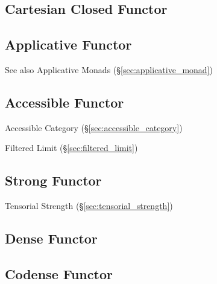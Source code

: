 \subsection{Cartesian Closed Functor}
\label{sec:cartesian_closed_functor}

\subsection{Applicative Functor}\label{sec:applicative_functor}

\fist See also Applicative Monads (\S\ref{sec:applicative_monad})



\subsection{Accessible Functor}\label{sec:accessible_functor}

Accessible Category (\S\ref{sec:accessible_category})

Filtered Limit (\S\ref{sec:filtered_limit})



\subsection{Strong Functor}\label{sec:strong_functor}

Tensorial Strength (\S\ref{sec:tensorial_strength})



\subsection{Dense Functor}\label{sec:dense_functor}

\subsection{Codense Functor}\label{sec:codense_functor}

